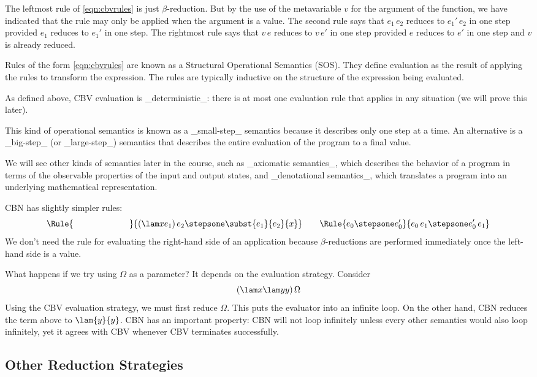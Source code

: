 The leftmost rule of \eqref{eqn:cbvrules} is just
$\beta$-reduction. But by the use of the metavariable $v$ for the
argument of the function, we have indicated that the rule may only be
applied when the argument is a value. The second rule says that
$e_1\,e_2$ reduces to $e_1'\,e_2$ in one step provided $e_1$ reduces
to $e_1'$ in one step. The rightmost rule says that $v\,e$ reduces to
$v\,e'$ in one step provided $e$ reduces to $e'$ in one step and $v$
is already reduced.

Rules of the form \eqref{eqn:cbvrules} are known as a Structural
Operational Semantics (SOS). They define evaluation as the result of
applying the rules to transform the expression. The rules are
typically inductive on the structure of the expression being
evaluated.

As defined above, CBV evaluation is _deterministic_: there is at most
one evaluation rule that applies in any situation (we will prove this
later).

This kind of operational semantics is known as a _small-step_
semantics because it describes only one step at a time. An alternative
is a _big-step_ (or _large-step_) semantics that describes the entire
evaluation of the program to a final value.

We will see other kinds of semantics later in the course, such as
_axiomatic semantics_, which describes the behavior of a program in
terms of the observable properties of the input and output states, and
_denotational semantics_, which translates a program into an
underlying mathematical representation.

CBN has slightly simpler rules:
\[
\Rule{\phantom{e_0 \stepsone e'_0}}{(\lam x{e_1})\,e_2 \stepsone \subst{e_1}{e_2}{x}}
\qquad
\Rule{e_0 \stepsone e'_0}{e_0\,e_1 \stepsone e'_0\,e_1}
\]
We don't need the rule for evaluating the right-hand side of an
application because $\beta$-reductions are performed immediately once
the left-hand side is a value.

What happens if we try using $\Omega$ as a parameter? It depends on
the evaluation strategy. Consider
\[
(\lam x{\lam yy})\,\Omega
\]
Using the CBV evaluation strategy, we must first reduce $\Omega$. This
puts the evaluator into an infinite loop. On the other hand, CBN
reduces the term above to $\lam{y}{y}$. CBN has an important property:
CBN will not loop infinitely unless every other semantics would also
loop infinitely, yet it agrees with CBV whenever CBV terminates
successfully.

\subsection{Other Reduction Strategies}

